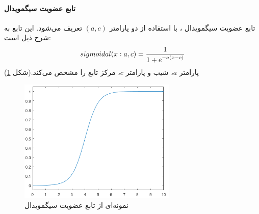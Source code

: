 \paragraph{تابع عضویت سیگمویدال}
تابع عضویت سیگمویدال
،
با استفاده از دو پارامتر $(a, c)$ تعریف می‌شود. این تابع به شرح ذیل است:
\begin{equation}\label{eq:e_fset_memfunc_sigmoidal}
sigmoidal (x: a, c) = \frac{1}{1+\mathlarger{e^{-a(x-c)}}} 
	\end{equation}
	پارامتر $a$، شیب و پارامتر $c$، مرکز تابع را مشخص می‌کند.(شکل \ref{fig:f_18})
\cite{yen1999fuzzy}
	\begin{figure}[h]
		\centering 
		\includegraphics[width=75mm]{Images/Fig18.png}
		\vspace{-0.5cm}
		\caption{نمونه‌ای از تابع عضویت سیگمویدال}\label{fig:f_18}
	\end{figure}
